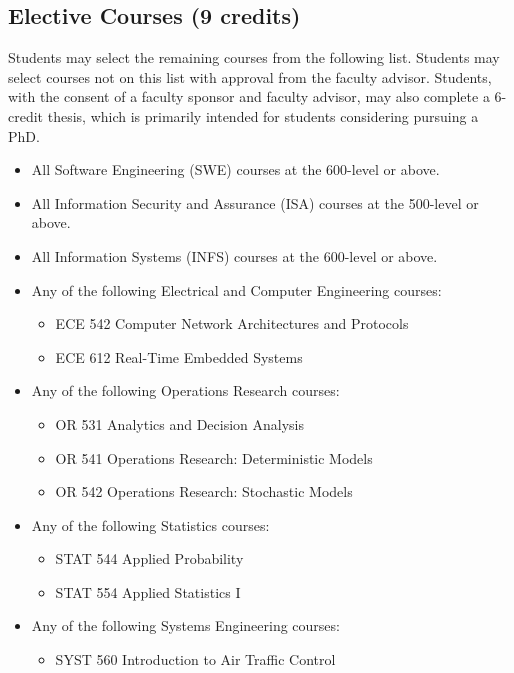 \documentclass[oneside,11pt]{memoir}
\begin{document}
\subsection{Elective Courses (9 credits)}

Students may select the remaining courses from the following list. Students may select courses not on this list with approval from the faculty advisor. Students, with the consent of a faculty sponsor and faculty advisor, may also complete a 6-credit thesis, which is primarily intended for students considering pursuing a PhD.

\begin{itemize}
    \item All Software Engineering (SWE) courses at the 600-level or above.
    \item All Information Security and Assurance (ISA) courses at the 500-level or above.
    \item All Information Systems (INFS) courses at the 600-level or above.
    \item Any of the following Electrical and Computer Engineering courses:
    \begin{itemize}
        \item ECE 542 Computer Network Architectures and Protocols
        \item ECE 612 Real-Time Embedded Systems
\end{itemize}        
    \item Any of the following Operations Research courses:
    \begin{itemize}
        \item OR 531 Analytics and Decision Analysis
        \item OR 541 Operations Research: Deterministic Models
        \item OR 542 Operations Research: Stochastic Models
\end{itemize}        
    \item Any of the following Statistics courses:
    \begin{itemize}
        \item STAT 544 Applied Probability
        \item STAT 554 Applied Statistics I
\end{itemize}        
    \item Any of the following Systems Engineering courses:
    \begin{itemize}
        \item SYST 560 Introduction to Air Traffic Control

\end{itemize}
\end{itemize}
\end{document}
